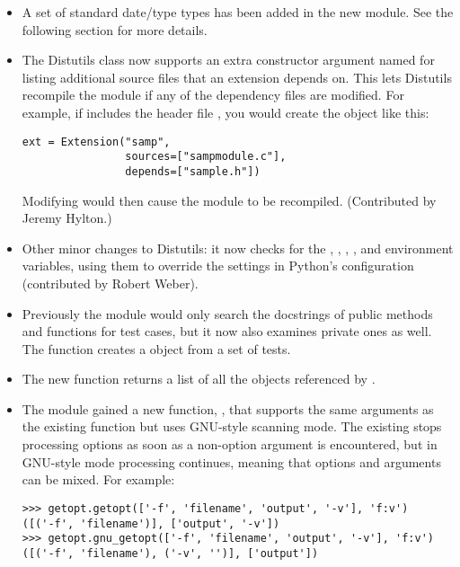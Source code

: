 \documentclass{howto}
\begin{document}
\begin{itemize}
\item A set of standard date/type types has been added in the new 
module.  See the following section for more details.

\item The Distutils  class now supports
an extra constructor argument named  for listing
additional source files that an extension depends on.  This lets
Distutils recompile the module if any of the dependency files are
modified.  For example, if  includes the header
file , you would create the  object like
this:

\begin{verbatim}
ext = Extension("samp",
                sources=["sampmodule.c"],
                depends=["sample.h"])
\end{verbatim}

Modifying  would then cause the module to be recompiled.
(Contributed by Jeremy Hylton.)

\item Other minor changes to Distutils:
it now checks for the , , ,
, and  environment variables, using
them to override the settings in Python's configuration (contributed
by Robert Weber).

\item Previously the  module would only search the
docstrings of public methods and functions for test cases, but it now
also examines private ones as well.  The 
function creates a  object from a set of
 tests.

\item The new  function returns a
list of all the objects referenced by .

\item The  module gained a new function,
, that supports the same arguments as the existing
 function but uses GNU-style scanning mode.
The existing  stops processing options as soon as a
non-option argument is encountered, but in GNU-style mode processing
continues, meaning that options and arguments can be mixed.  For
example:

\begin{verbatim}
>>> getopt.getopt(['-f', 'filename', 'output', '-v'], 'f:v')
([('-f', 'filename')], ['output', '-v'])
>>> getopt.gnu_getopt(['-f', 'filename', 'output', '-v'], 'f:v')
([('-f', 'filename'), ('-v', '')], ['output'])
\end{verbatim}


\end{itemize}
\end{document}
